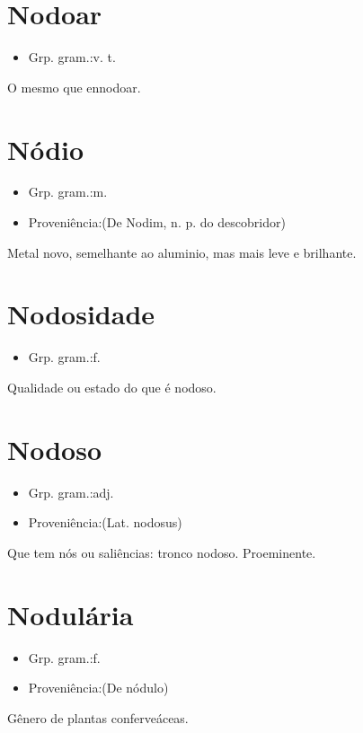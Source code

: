 \section{Nodoar}
\begin{itemize}
\item {Grp. gram.:v. t.}
\end{itemize}
O mesmo que \textunderscore ennodoar\textunderscore .
\section{Nódio}
\begin{itemize}
\item {Grp. gram.:m.}
\end{itemize}
\begin{itemize}
\item {Proveniência:(De \textunderscore Nodim\textunderscore , n. p. do descobridor)}
\end{itemize}
Metal novo, semelhante ao aluminio, mas mais leve e brilhante.
\section{Nodosidade}
\begin{itemize}
\item {Grp. gram.:f.}
\end{itemize}
Qualidade ou estado do que é nodoso.
\section{Nodoso}
\begin{itemize}
\item {Grp. gram.:adj.}
\end{itemize}
\begin{itemize}
\item {Proveniência:(Lat. \textunderscore nodosus\textunderscore )}
\end{itemize}
Que tem nós ou saliências: \textunderscore tronco nodoso\textunderscore .
Proeminente.
\section{Nodulária}
\begin{itemize}
\item {Grp. gram.:f.}
\end{itemize}
\begin{itemize}
\item {Proveniência:(De \textunderscore nódulo\textunderscore )}
\end{itemize}
Gênero de plantas conferveáceas.
